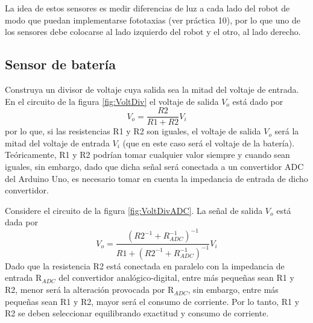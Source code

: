 \documentclass[a4paper,12pt]{article}
\newcommand\ddfrac[2]{\frac{\displaystyle #1}{\displaystyle #2}}
\begin{document}
La idea de estos sensores es medir diferencias de luz a cada lado del robot de modo que puedan implementarse fototaxias (ver práctica 10), por lo que uno de los sensores debe colocarse al lado izquierdo del robot y el otro, al lado derecho. 

\subsection{Sensor de batería}
Construya un divisor de voltaje cuya salida sea la mitad del voltaje de entrada. En el circuito de la figura \ref{fig:VoltDiv} el voltaje de salida $V_o$ está dado por
\[V_o = \ddfrac{R2}{R1 + R2}V_i\]
por lo que, si las resistencias R1 y R2 son iguales, el voltaje de salida $V_o$ será la mitad del voltaje de entrada $V_i$ (que en este caso será el voltaje de la batería). Teóricamente, R1 y R2 podrían tomar cualquier valor siempre y cuando sean iguales, sin embargo, dado que dicha señal será conectada a un convertidor ADC del Arduino Uno, es necesario tomar en cuenta la impedancia de entrada de dicho convertidor. 

Considere el circuito de la figura \ref{fig:VoltDivADC}. La señal de salida $V_o$ está dada por
\[V_o = \ddfrac{\left(R2^{-1} + R_{ADC}^{-1}\right)^{-1}}{R1 + \left(R2^{-1} + R_{ADC}^{-1}\right)^{-1}}V_i\]
Dado que la resistencia R2 está conectada en paralelo con la impedancia de entrada $\textrm{R}_{ADC}$ del convertidor analógico-digital, entre más pequeñas sean R1 y R2, menor será la alteración provocada por $\textrm{R}_{ADC}$, sin embargo, entre más pequeñas sean R1 y R2, mayor será el consumo de corriente. Por lo tanto, R1 y R2 se deben seleccionar equilibrando exactitud y consumo de corriente. 
\end{document}
